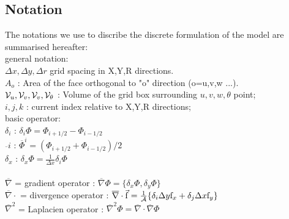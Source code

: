 
\subsection{Notation} 

The notations we use to discribe the discrete formulation 
of the model are summarised hereafter:\\
general notation:
\\ $\Delta x, \Delta y, \Delta r$ grid spacing in X,Y,R directions.
\\ $A_o$ : Area of the face orthogonal to "o" direction (o=u,v,w ...).
\\ ${\cal V}_u , {\cal V}_v , {\cal V}_v , {\cal V}_\theta$ :
Volume of the grid box surrounding $u,v,w,\theta$ point;
\\ $i,j,k$ : current index relative to X,Y,R directions;
\\basic operator:
\\ $\delta_i $ : $\delta_i \Phi = \Phi_{i+1/2} - \Phi_{i-1/2} $
\label{eq:delta_i}
\\ $\overline{~}i$ : $\overline{\Phi}^i = ( \Phi_{i+1/2} + \Phi_{i-1/2} ) / 2 $ 
\label{eq:bar_i}
\\ $\delta_x $ : $\delta_x \Phi = \frac{1}{\Delta x} \delta_i \Phi $
\label{eq:delta_x}
\\
\\ $\overline{\nabla}$ = gradient operator :  
$\overline{\nabla} \Phi = \{ \delta_x \Phi , \delta_y \Phi \}$
\label{eq:d_grad}
\\ $\overline{\nabla} \cdot$ = divergence operator :  
$\overline{\nabla}\cdot \vec{\mathrm{f}}  = 
\frac{1}{\cal A} \{ \delta_i \Delta y \mathrm{f}_x 
                  + \delta_j \Delta x \mathrm{f}_y \} $
\label{eq:d_div}
\\ $\overline{\nabla}^2 $ = Laplacien operator :
$ \overline{\nabla}^2 \Phi = 
   \overline{\nabla}\cdot \overline{\nabla}\Phi $
\label{eq:d_lap}
